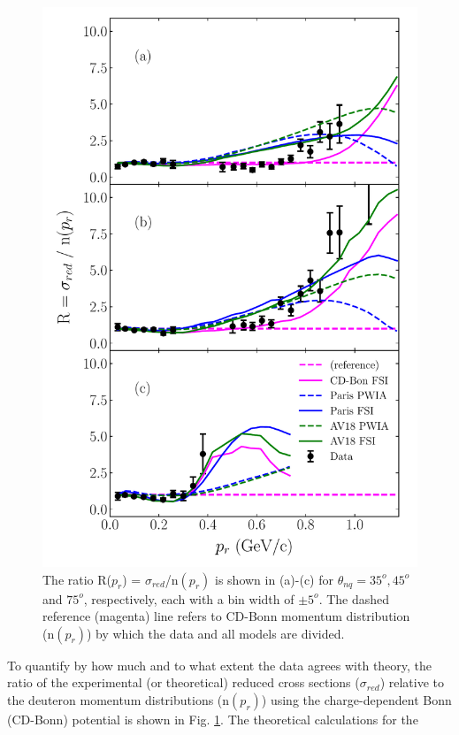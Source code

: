 \begin{figure}
\includegraphics[scale=0.5]{../prl_plots/PRL_plot2.pdf}
\caption{The ratio R($p_{r}$) = $\sigma_{red}$/n$(p_{r})$ is shown in (a)-(c) for $\theta_{nq}=35^{o}, 45^{o}$ and $75^{o}$, respectively, each with a bin width of $\pm 5^{o}$.
                              The dashed reference (magenta) line refers to CD-Bonn momentum distribution (n$(p_{r})$) by which the data and all models are divided. }
\label{fig:fig1}
\end{figure}
\indent To quantify by how much and to what extent the data agrees with theory, the ratio of the experimental (or theoretical) reduced cross sections ($\sigma_{red}$)
relative to the deuteron momentum distributions (n$(p_{r})$) using the charge-dependent Bonn (CD-Bonn)\cite{PhysRevC.63.024001} potential is shown in Fig. \ref{fig:fig1}. The theoretical calculations for the
